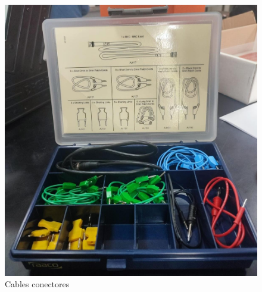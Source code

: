 \documentclass[twocolumn]{article}
\begin{document}
\begin{otherlanguage}{spanish}
\begin{figure}[H]
    \centering
    \includegraphics[width=0.8\linewidth]{Figures/figura/WhatsApp Image 2024-11-13 at 4.51.03 PM.jpeg}
    \caption{Cables conectores}
    \label{}
\end{figure}

\end{otherlanguage}
\end{document}
